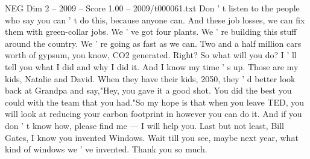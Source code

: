 \begin{textsample}{NEG Dim 2 – 2009 – Score 1.00 – 2009/t000061.txt}
Don ' t listen to the people who say you can ' t do this, because anyone can.
And these job losses, we can fix them with green-collar jobs.
We ' ve got four plants.
We ' re building this stuff around the country.
We ' re going as fast as we can.
Two and a half million cars worth of gypsum, you know, CO2 generated.
Right?
So what will you do?
I ' ll tell you what I did and why I did it.
And I know my time ' s up.
Those are my kids, Natalie and David.
When they have their kids, 2050, they ' d better look back at Grandpa and say,"Hey, you gave it a good shot.
You did the best you could with the team that you had."So my hope is that when you leave TED, you will look at reducing your carbon footprint in however you can do it.
And if you don ' t know how, please find me — I will help you.
Last but not least, Bill Gates, I know you invented Windows.
Wait till you see, maybe next year, what kind of windows we ' ve invented.
Thank you so much.

\end{textsample}
